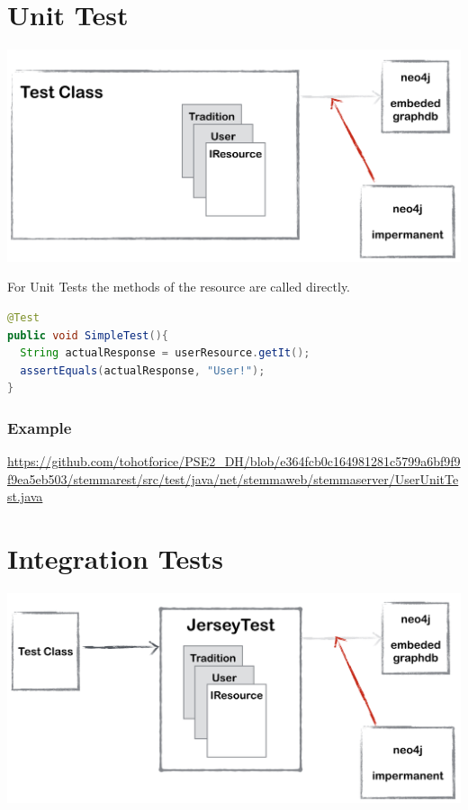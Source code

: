 \documentclass[11pt,fleqn,openany]{book} %
\begin{document}

\chapter{Unit Test}

\begin{center}
\includegraphics[scale=.4]{Pictures/junitoverview.png}
\end{center} 
 
For Unit Tests the methods of the resource are called directly.
\begin{lstlisting}[language=java]
@Test
public void SimpleTest(){
  String actualResponse = userResource.getIt();
  assertEquals(actualResponse, "User!");
}
\end{lstlisting}


\subsection*{Example}
\url{https://github.com/tohotforice/PSE2_DH/blob/e364fcb0c164981281c5799a6bf9f9f9ea5eb503/stemmarest/src/test/java/net/stemmaweb/stemmaserver/UserUnitTest.java}


\chapter{Integration Tests}

\begin{center}
\includegraphics[scale=.4]{Pictures/jerseytestoverview.png} 
\end{center}
\end{document}
